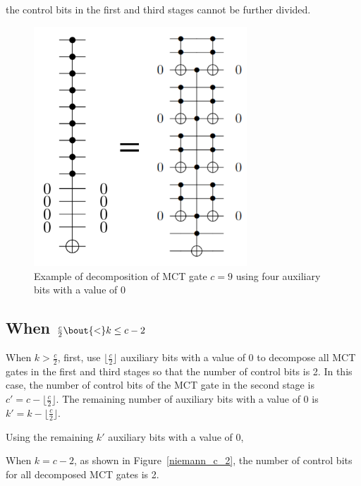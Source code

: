 the control bits in the first and third stages cannot be further divided.
\begin{figure}[tbp]
\centering
\includegraphics[width=8cm]{img/niemann_k_frac_c_2.pdf}
\caption{Example of decomposition of MCT gate $c=9$ using four auxiliary bits with a value of 0}
\label{niemann_frac_c_2}
\end{figure}
\subsection*{When $\frac{c}{2} \bout{<} k \leq c-2$}
When $k>\frac{c}{2}$,
first, use $\lfloor\frac{c}{2}\rfloor$ auxiliary bits with a value of 0 to decompose all MCT gates in the first and third stages so that the number of control bits is 2.
In this case, the number of control bits of the MCT gate in the second stage is $c'=c-\lfloor \frac{c}{2}\rfloor$.
The remaining number of auxiliary bits with a value of 0 is $k'=k-\lfloor \frac{c}{2} \rfloor$.

Using the remaining $k'$ auxiliary bits with a value of 0,
\par
When $k=c-2$,
as shown in Figure~\ref{niemann_c_2},
the number of control bits for all decomposed MCT gates is 2.

